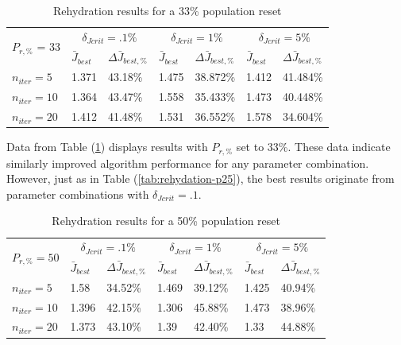 \begin{table}[H]
  \centering
  \begin{tabular}{lll|ll|ll}
    \toprule
    \multirow{2}{*}{$P_{r,\text{\%}}$ = 33} &
      \multicolumn{2}{c}{$\delta_{Jcrit} = .1\%$ } &
      \multicolumn{2}{c}{$\delta_{Jcrit} = 1\%$ } &
      \multicolumn{2}{c}{$\delta_{Jcrit} = 5\%$ } \\
      \cmidrule{2-7}
    & $\bar{J}_{best}$ & $\Delta \bar{J}_{best,\text{\%}}$ & $\bar{J}_{best}$ & $\Delta \bar{J}_{best,\text{\%}}$ & $\bar{J}_{best}$ & $\Delta \bar{J}_{best,\text{\%}}$ \\
    \midrule

    $n_{iter}=5$ & 1.371 & 43.18\% & 1.475 & 38.872\% & 1.412 & 41.484\% \\
    $n_{iter}=10$ & 1.364 & 43.47\% & 1.558 & 35.433\% & 1.473 & 40.448\% \\
    $n_{iter}=20$ & 1.412 & 41.48\% & 1.531 & 36.552\% & 1.578 & 34.604\% \\
    \bottomrule
  \end{tabular}
  \caption{Rehydration results for a 33\% population reset}
  \label{tab:rehydation-p33}
\end{table}

\noindent Data from Table (\ref{tab:rehydation-p33}) displays results with $P_{r,\text{\%}}$ set to 33\%. These data indicate similarly
improved algorithm performance for any parameter combination. However, just as in Table (\ref{tab:rehydation-p25}), the best results
originate from parameter combinations with $\delta_{Jcrit} = .1$.

\begin{table}[H]
    \centering
    \begin{tabular}{lll|ll|ll}
      \toprule
      \multirow{2}{*}{$P_{r,\text{\%}} = 50$} &
        \multicolumn{2}{c}{$\delta_{Jcrit} = .1\%$ } &
        \multicolumn{2}{c}{$\delta_{Jcrit} = 1\%$ } &
        \multicolumn{2}{c}{$\delta_{Jcrit} = 5\%$ } \\
        \cmidrule{2-7}
      & $\bar{J}_{best}$ & $\Delta \bar{J}_{best,\text{\%}}$ & $\bar{J}_{best}$ & $\Delta \bar{J}_{best,\text{\%}}$ & $\bar{J}_{best}$ & $\Delta \bar{J}_{best,\text{\%}}$ \\
      \midrule

      $n_{iter}=5$ & 1.58 & 34.52\% & 1.469 & 39.12\% & 1.425 & 40.94\% \\
      $n_{iter}=10$ & 1.396 & 42.15\% & 1.306 & 45.88\% & 1.473 & 38.96\% \\
      $n_{iter}=20$ & 1.373 & 43.10\% & 1.39 & 42.40\% & 1.33 & 44.88\% \\
      \bottomrule
    \end{tabular}
    \caption{Rehydration results for a 50\% population reset}
    \label{tab:rehydation-p50}
  \end{table}


